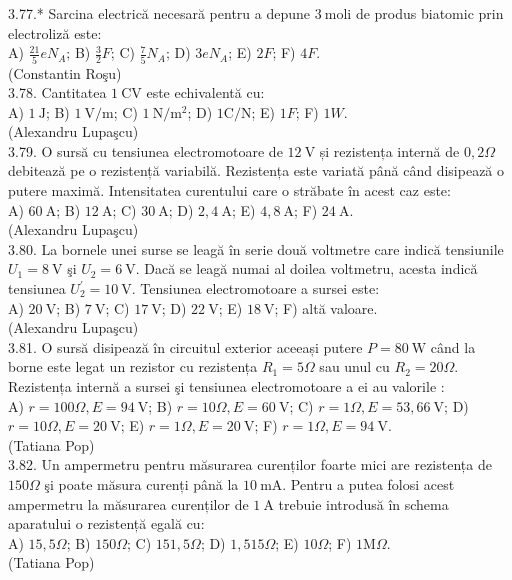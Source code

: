 3.77.* Sarcina electrică necesară pentru a depune $3 \mathrm{~moli}$ de produs biatomic prin electroliză este:\\ A) $\frac{21}{5} e N_{A}$; B) $\frac{3}{2} F$; C) $\frac{7}{5} N_{A}$; D) $3 e N_{A}$; E) $2 F$; F) $4 F$.\\ (Constantin Roşu)\\

3.78. Cantitatea $1 \mathrm{~CV}$ este echivalentă cu:\\ A) $1 \mathrm{~J}$; B) $1 \mathrm{~V} / \mathrm{m}$; C) $1 \mathrm{~N} / \mathrm{m}^{2}$; D) $1 \mathrm{C} / \mathrm{N}$; E) $1 F$; F) $1 W$.\\ (Alexandru Lupaşcu)\\

3.79. O sursă cu tensiunea electromotoare de  $12 \mathrm{~V}$ și rezistența internă de $0,2 \Omega$ debitează pe o rezistență variabilă. Rezistența este variată până când disipează o putere maximă. Intensitatea curentului care o străbate în acest caz este:\\ A)  $60 \mathrm{~A}$; B) $12 \mathrm{~A}$; C) $30 \mathrm{~A}$; D) $2,4 \mathrm{~A}$; E) $4,8 \mathrm{~A}$; F) $24 \mathrm{~A}$.\\ (Alexandru Lupaşcu)\\

3.80. La bornele unei surse se leagă în serie două voltmetre care indică tensiunile $U_{1}=8 \mathrm{~V}$ şi $U_{2}=6 \mathrm{~V}$. Dacă se leagă numai al doilea voltmetru, acesta indică tensiunea $U_{2}^{\prime}=10 \mathrm{~V}$. Tensiunea electromotoare a sursei este:\\ A) $20 \mathrm{~V}$; B)  $7 \mathrm{~V}$; C)  $17 \mathrm{~V}$; D)  $22 \mathrm{~V}$; E)  $18 \mathrm{~V}$; F) altă valoare.\\ (Alexandru Lupaşcu)\\

3.81. O sursă disipează în circuitul exterior aceeași putere $P=80 \mathrm{~W}$ când la borne este legat un rezistor cu rezistența $R_{1}=5 \Omega$ sau unul cu $R_{2}=20 \Omega$. Rezistența internă a sursei şi tensiunea electromotoare a ei au valorile :\\ A) $r=100 \Omega, E=94 \mathrm{~V}$; B) $r=10 \Omega, E=60 \mathrm{~V}$; C) $r=1 \Omega, E=53,66 \mathrm{~V}$; D) $r=10 \Omega, E=20 \mathrm{~V}$; E) $r=1 \Omega, E=20 \mathrm{~V}$; F) $r=1 \Omega, E=94 \mathrm{~V}$.\\ (Tatiana Pop)\\

3.82. Un ampermetru pentru măsurarea curenților foarte mici are rezistența de $150 \Omega$ şi poate măsura curenți până la $10 \mathrm{~mA}$. Pentru a putea folosi acest ampermetru la măsurarea curenților de $1 \mathrm{~A}$ trebuie introdusă în schema aparatului o rezistență egală cu:\\ A) $15,5 \Omega$; B) $150 \Omega$; C) $151,5 \Omega$; D) $1,515 \Omega$; E) $10 \Omega$; F) $1 \mathrm{M} \Omega$.\\ (Tatiana Pop)\\

